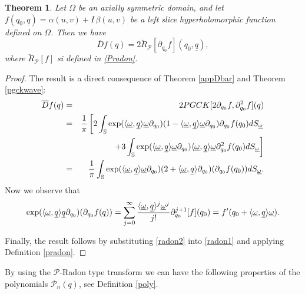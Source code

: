 \documentclass[reqno,11pt]{amsart}
\numberwithin{equation}{section}
\newtheorem{theorem}{Theorem}[section]
\theoremstyle{definition}
\begin{document}
\begin{theorem}
\label{barR}
Let $\Omega$ be an axially symmetric domain, and let $f(q_0,\underline{q})=\alpha(u,v)+I\,\beta(u,v)$ be a left slice hyperholomorphic function defined on $\Omega$. Then we have
\begin{equation}
\overline{D}f(q)= 2 \breve{R}_{\mathcal{P}}[\partial_{q_0}f](q_0, \underline{q}),
\end{equation}
where $\breve{R}_{\mathcal{P}}[f]$ si defined in \eqref{Pradon}.
\end{theorem}
\begin{proof}
The result is a direct consequence of Theorem \ref{appDbar} and Theorem \ref{pgckwave}:
\begin{eqnarray}
\nonumber
\overline{D}f(q)&=&2 PGCK[2 \partial_{q_0}f, \partial_{q_0}^2f](q)\\
\nonumber
&=& \frac{1}{\pi} \left[2 \int_{\mathbb{S}} \hbox{exp}(\langle \underline{\omega}, \underline{q} \rangle \underline{\omega}\partial_{q_0})(1- \langle \underline{\omega} ,\underline{q} \rangle  \underline{\omega}\partial_{q_0}) \partial_{q_0} f(q_0)dS_{\underline{\omega}} \right.\\
\nonumber
&& \left. + 3 \int_{\mathbb{S}}  \hbox{exp}(\langle \underline{\omega}, \underline{q} \rangle \underline{\omega}\partial_{q_0})\langle \underline{\omega}, \underline{q} \rangle \underline{\omega} \partial_{q_0}^2 f(q_0) dS_{\underline{\omega}} \right]\\
\label{radon1}
&=& \frac{1}{\pi} \int_{\mathbb{S}} \hbox{exp}(\langle \underline{\omega}, \underline{q} \rangle \underline{\omega} \partial_{q_0}) (2+ \langle \underline{\omega},  \underline{q} \rangle \partial_{q_0}) (\partial_{q_0}f(q_0)) dS_{\underline{\omega}}.
\end{eqnarray}
 Now we observe that
\begin{equation}
\label{radon2}
\hbox{exp}(\langle \underline{\omega}, \underline{q} \rangle \underline{q} \partial_{q_0})(\partial_{q_0}f(q))= \sum_{j=0}^{\infty} \frac{\langle \underline{\omega}, \underline{q} \rangle^j \underline{\omega}^j}{j!} \partial_{q_0}^{j+1}[f](q_0)=f'(q_0+\langle \underline{\omega}, \underline{q} \rangle \underline{\omega}).
\end{equation}

Finally, the result follows by substituting \eqref{radon2} into \eqref{radon1} and applying Definition \ref{pradon}.
\end{proof}

By using the $ \mathcal{P}$-Radon type transform we can have the following properties of the polynomials $\mathcal{P}_n(q)$, see Definition \ref{poly}.
\end{document}
